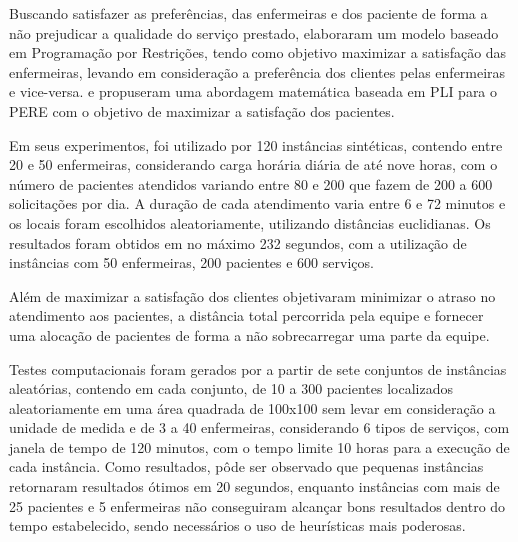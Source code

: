Buscando satisfazer as preferências, das enfermeiras e dos paciente de forma a não prejudicar a qualidade do serviço prestado,  elaboraram um modelo baseado em Programação por Restrições, tendo como objetivo maximizar a satisfação das enfermeiras, levando em consideração a preferência dos clientes pelas enfermeiras e vice-versa.  e  propuseram uma abordagem matemática baseada em \ac{PLI} para o \ac{PERE} com o objetivo de maximizar a satisfação dos pacientes.

Em seus experimentos, foi utilizado por  120 instâncias sintéticas, contendo entre 20 e 50 enfermeiras, considerando carga horária diária de até nove horas, com o número de pacientes atendidos variando entre 80 e 200 que fazem de 200 a 600 solicitações por dia. A duração de cada atendimento varia entre 6 e 72 minutos e os locais foram escolhidos aleatoriamente, utilizando distâncias euclidianas.
Os resultados foram obtidos em no máximo 232 segundos, com a utilização de instâncias com 50 enfermeiras, 200 pacientes e 600 serviços.

Além de maximizar a satisfação dos clientes  objetivaram minimizar o atraso no atendimento aos pacientes, a distância total percorrida pela equipe e fornecer uma alocação de pacientes de forma a não sobrecarregar uma parte da equipe.

Testes computacionais foram gerados por   a partir de sete conjuntos de instâncias aleatórias, contendo em cada conjunto, de 10 a 300 pacientes localizados aleatoriamente em uma área quadrada de 100x100 sem levar em consideração a unidade de medida e de 3 a 40 enfermeiras, considerando 6 tipos de serviços, com janela de tempo de 120 minutos, com o tempo limite 10 horas para a execução de cada instância. 
Como resultados, pôde ser observado que pequenas instâncias retornaram resultados ótimos em 20 segundos, enquanto instâncias com mais de 25 pacientes e 5 enfermeiras não conseguiram alcançar bons resultados dentro do tempo estabelecido, sendo necessários o uso de heurísticas mais poderosas.

